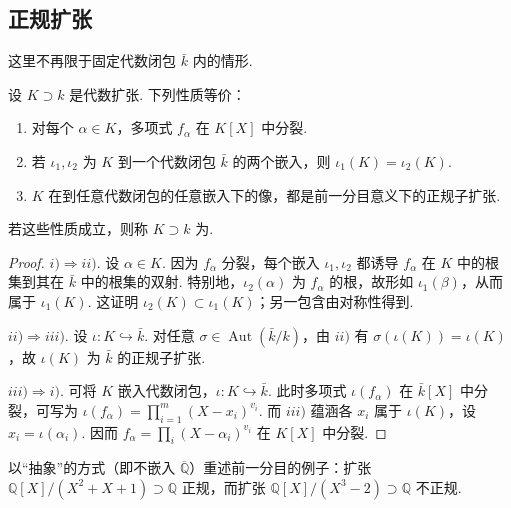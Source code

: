 \subsection{正规扩张}\label{sec:galois-2-3-4}
这里不再限于固定代数闭包 $\bar k$ 内的情形.
\begin{proposition*}
设 $K\supset k$ 是代数扩张. 下列性质等价：
\begin{enumerate}[label=\roman*)]
\item 对每个 $\alpha\in K$，多项式 $f_\alpha$ 在 $K[X]$ 中分裂.
\item 若 $\iota_1,\iota_2$ 为 $K$ 到一个代数闭包 $\bar k$ 的两个嵌入，则 $\iota_1(K)=\iota_2(K)$.
\item $K$ 在到任意代数闭包的任意嵌入下的像，都是前一分目意义下的正规子扩张.
\end{enumerate}
若这些性质成立，则称 $K\supset k$ 为.
\end{proposition*}
\begin{proof}
$i)\Rightarrow ii)$. 设 $\alpha\in K$. 因为 $f_\alpha$ 分裂，每个嵌入 $\iota_1,\iota_2$ 都诱导 $f_\alpha$ 在 $K$ 中的根集到其在 $\bar k$ 中的根集的双射. 特别地，$\iota_2(\alpha)$ 为 $f_\alpha$ 的根，故形如 $\iota_1(\beta)$，从而属于 $\iota_1(K)$. 这证明 $\iota_2(K)\subset\iota_1(K)$；另一包含由对称性得到.

$ii)\Rightarrow iii)$. 设 $\iota:K\hookrightarrow\bar k$. 对任意 $\sigma\in\operatorname{Aut}(\bar k/k)$，由 $ii)$ 有 $\sigma(\iota(K))=\iota(K)$，故 $\iota(K)$ 为 $\bar k$ 的正规子扩张.

$iii)\Rightarrow i)$. 可将 $K$ 嵌入代数闭包，$\iota:K\hookrightarrow\bar k$. 此时多项式 $\iota(f_\alpha)$ 在 $\bar k[X]$ 中分裂，可写为 $\iota(f_\alpha)=\prod_{i=1}^m(X-x_i)^{v_i}$. 而 $iii)$ 蕴涵各 $x_i$ 属于 $\iota(K)$，设 $x_i=\iota(\alpha_i)$. 因而 $f_\alpha=\prod_i(X-\alpha_i)^{v_i}$ 在 $K[X]$ 中分裂.
\end{proof}
\begin{example*}
以``抽象''的方式（即不嵌入 $\overline{\mathbb Q}$）重述前一分目的例子：扩张 $\mathbb Q[X]/(X^2+X+1)\supset\mathbb Q$ 正规，而扩张 $\mathbb Q[X]/(X^3-2)\supset\mathbb Q$ 不正规.
\end{example*}
